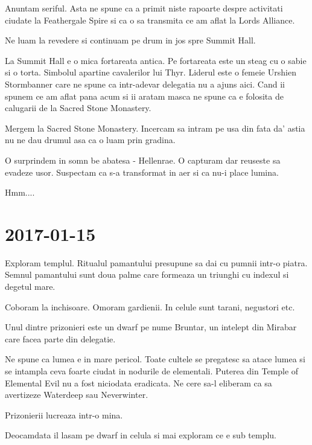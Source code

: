 \documentclass[12pt,oneside]{book}
\begin{document}
Anuntam seriful. Asta ne spune ca a primit niste rapoarte despre activitati ciudate
la Feathergale Spire si ca o sa transmita ce am aflat la Lords Alliance.

Ne luam la revedere si continuam pe drum in jos spre Summit Hall.

La Summit Hall e o mica fortareata antica. Pe fortareata este un steag cu o sabie si
o torta. Simbolul apartine cavalerilor lui Thyr. Liderul este o femeie Urshien 
Stormbanner care ne spune ca intr-adevar delegatia nu a ajuns aici. Cand ii spunem
ce am aflat pana acum si ii aratam masca ne spune ca e folosita de calugarii de la 
Sacred Stone Monastery.

Mergem la Sacred Stone Monastery. Incercam sa intram pe usa din fata da' astia
nu ne dau drumul asa ca o luam prin gradina.

O surprindem in somn be abatesa - Hellenrae. O capturam dar reuseste sa evadeze usor.
Suspectam ca s-a transformat in aer si ca nu-i place lumina. 

Hmm....

\section{2017-01-15}

Exploram templul. Ritualul pamantului presupune sa dai cu pumnii intr-o piatra.
Semnul pamantului sunt doua palme care formeaza un triunghi cu indexul si degetul
mare.

Coboram la inchisoare. Omoram gardienii. In celule sunt tarani, negustori etc.

Unul dintre prizonieri este un dwarf pe nume Bruntar, un intelept din Mirabar care
facea parte din delegatie. 

Ne spune ca lumea e in mare pericol. Toate cultele se pregatesc sa  atace lumea si 
se intampla ceva foarte ciudat in nodurile de  elementali. Puterea din Temple of 
Elemental Evil nu a fost niciodata eradicata. Ne cere sa-l eliberam ca sa avertizeze 
Waterdeep sau Neverwinter.

Prizonierii lucreaza intr-o mina.

Deocamdata il lasam pe dwarf in celula si mai exploram ce e sub templu.
	
\newpage
\end{document}

